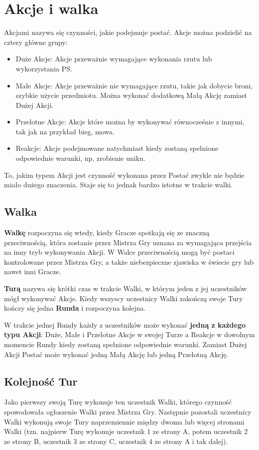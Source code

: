 \documentclass[10pt,a4paper]{book}
\begin{document}
\section{Akcje i walka}
\begin{multicols}{2}

Akcjami nazywa się czynności, jakie podejmuje postać. Akcje można podzielić na cztery główne grupy:
\begin{itemize}
	\item Duże Akcje: Akcje przeważnie wymagające wykonania rzutu lub wykorzystania PS.
	\item Małe Akcje: Akcje przeważnie nie wymagające rzutu, takie jak dobycie broni, szybkie użycie przedmiotu. Można wykonać dodatkową Małą Akcję zamiast Dużej Akcji.
	\item Przelotne Akcje: Akcje które można by wykonywać równocześnie z innymi, tak jak na przykład bieg, mowa.
	\item Reakcje: Akcje podejmowane natychmiast kiedy zostaną spełnione odpowiednie warunki, np. zrobienie uniku.
\end{itemize}

To, jakim typem Akcji jest czynność wykonana przez Postać zwykle nie będzie miało dużego znaczenia. Staje się to jednak bardzo istotne w trakcie walki.


\subsection*{Walka}
\textbf{Walkę} rozpoczyna się wtedy, kiedy Gracze spotkają się ze znaczną przeciwnością, która zostanie przez Mistrza Gry uznana za wymagająca przejścia na inny tryb wykonywania Akcji. W Walce przeciwnością mogą być postaci kontrolowane przez Mistrza Gry, a także niebezpieczne zjawiska w świecie gry lub nawet inni Gracze.

\textbf{Turą} nazywa się krótki czas w trakcie Walki, w którym jeden z jej uczestników mógł wykonywać Akcje. Kiedy wszyscy uczestnicy Walki zakończą swoje Tury kończy się jedna \textbf{Runda} i rozpoczyna kolejna.

W trakcie jednej Rundy każdy z uczestników może wykonać \textbf{jedną z każdego typu Akcji}: Duże, Małe i Przelotne Akcje w swojej Turze a Reakcje w dowolnym momencie Rundy kiedy zostaną spełnione odpowiednie warunki. Zamiast Dużej Akcji Postać może wykonać jedną Małą Akcję lub jedną Przelotną Akcję.


\subsection*{Kolejność Tur}
Jako pierwszy swoją Turę wykonuje ten uczestnik Walki, którego czynność spowodowała ogłoszenie Walki przez Mistrza Gry. Następnie pozostali uczestnicy Walki wykonują swoje Tury naprzemiennie między dwoma lub więcej stronami Walki (tzn. najpierw Turę wykonuje uczestnik 1 ze strony A, potem uczestnik 2 ze strony B, uczestnik 3 ze strony C, uczestnik 4 ze strony A i tak dalej).



\end{multicols}
\end{document}
